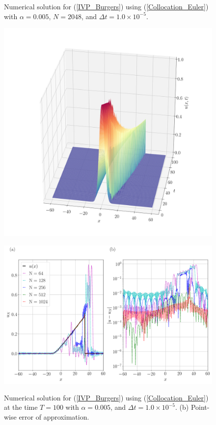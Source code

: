 	
	\begin{figure}[H]
		\centering
		\caption{Numerical solution for (\ref{IVP_Burgers}) using (\ref{Collocation_Euler}) with $\alpha = 0.005$, $N=2048$, and $\Delta t = 1.0 \times 10^{-5}$.}
		\includegraphics[width=12cm]{burgers_equation/deterministic/numerical_experiments/viscid/figures/collocation/Numerical_Solution_alpha=0005.png}
		\label{Collocation_alpha=005}
		\caption{Numerical solution for (\ref{IVP_Burgers}) using (\ref{Collocation_Euler}) at the time $T = 100$ with $\alpha = 0.005$, and $\Delta t = 1.0 \times 10^{-5}$. (b) Point-wise error of approximation.}
		\includegraphics[width=12.5cm]{burgers_equation/deterministic/numerical_experiments/viscid/figures/collocation/Numerical_Solution_alpha=0005_T=100.png}
		\label{Collocation_alpha=005_T}
	\end{figure}
	
